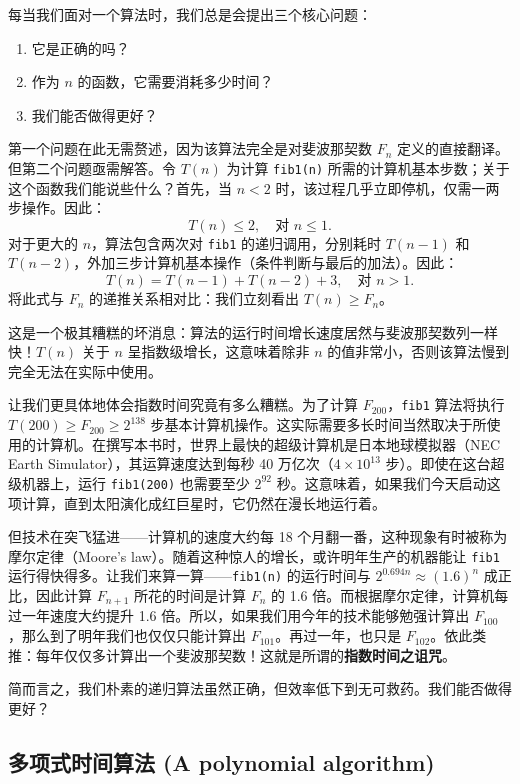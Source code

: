 每当我们面对一个算法时，我们总是会提出三个核心问题：
\begin{enumerate}
    \item 它是正确的吗？
    \item 作为 $n$ 的函数，它需要消耗多少时间？
    \item 我们能否做得更好？
\end{enumerate}

第一个问题在此无需赘述，因为该算法完全是对斐波那契数 $F_n$ 定义的直接翻译。但第二个问题亟需解答。令 $T(n)$ 为计算 \texttt{fib1(n)} 所需的计算机基本步数；关于这个函数我们能说些什么？首先，当 $n < 2$ 时，该过程几乎立即停机，仅需一两步操作。因此：
\[
T(n) \le 2, \quad \text{对 } n \le 1.
\]
对于更大的 $n$，算法包含两次对 \texttt{fib1} 的递归调用，分别耗时 $T(n - 1)$ 和 $T(n - 2)$，外加三步计算机基本操作（条件判断与最后的加法）。因此：
\[
T(n) = T(n - 1) + T(n - 2) + 3, \quad \text{对 } n > 1.
\]
将此式与 $F_n$ 的递推关系相对比：我们立刻看出 $T(n) \ge F_n$。

这是一个极其糟糕的坏消息：算法的运行时间增长速度居然与斐波那契数列一样快！$T(n)$ 关于 $n$ 呈指数级增长，这意味着除非 $n$ 的值非常小，否则该算法慢到完全无法在实际中使用。

让我们更具体地体会指数时间究竟有多么糟糕。为了计算 $F_{200}$，\texttt{fib1} 算法将执行 $T(200) \ge F_{200} \ge 2^{138}$ 步基本计算机操作。这实际需要多长时间当然取决于所使用的计算机。在撰写本书时，世界上最快的超级计算机是日本地球模拟器（NEC Earth Simulator），其运算速度达到每秒 40 万亿次（$4 \times 10^{13}$ 步）。即使在这台超级机器上，运行 \texttt{fib1(200)} 也需要至少 $2^{92}$ 秒。这意味着，如果我们今天启动这项计算，直到太阳演化成红巨星时，它仍然在漫长地运行着。

但技术在突飞猛进——计算机的速度大约每 18 个月翻一番，这种现象有时被称为摩尔定律（Moore's law）。随着这种惊人的增长，或许明年生产的机器能让 \texttt{fib1} 运行得快得多。让我们来算一算——\texttt{fib1(n)} 的运行时间与 $2^{0.694n} \approx (1.6)^n$ 成正比，因此计算 $F_{n+1}$ 所花的时间是计算 $F_n$ 的 1.6 倍。而根据摩尔定律，计算机每过一年速度大约提升 1.6 倍。所以，如果我们用今年的技术能够勉强计算出 $F_{100}$，那么到了明年我们也仅仅只能计算出 $F_{101}$。再过一年，也只是 $F_{102}$。依此类推：每年仅仅多计算出一个斐波那契数！这就是所谓的\textbf{指数时间之诅咒}。

简而言之，我们朴素的递归算法虽然正确，但效率低下到无可救药。我们能否做得更好？

\subsection*{多项式时间算法 (A polynomial algorithm)}


